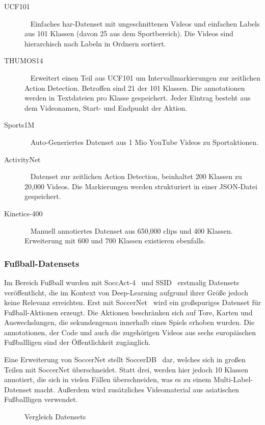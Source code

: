 \begin{description}
    \item[UCF101]~\cite{Soomro12} Einfaches \gls{har}-Datenset mit ungeschnittenen Videos und einfachen Labels aus 101 Klassen (davon 25 aus dem Sportbereich).
    Die Videos sind hierarchisch nach Labeln in Ordnern sortiert.
    \item[THUMOS14]~\cite{THUMOS14} Erweitert einen Teil aus UCF101 um Intervallmarkierungen zur zeitlichen Action Detection.
    Betroffen sind 21 der 101 Klassen.
    Die \gls{annotationen} werden in Textdateien pro Klasse gespeichert.
    Jeder Eintrag besteht aus dem Videonamen, Start- und Endpunkt der Aktion.
    \item[Sports1M]~\cite{Karpathy14} Auto-Generiertes Datenset aus 1 Mio YouTube Videos zu Sportaktionen.
    \item[ActivityNet]~\cite{Caba15} Datenset zur zeitlichen Action Detection, beinhaltet 200 Klassen zu 20,000 Videos.
    Die Markierungen werden strukturiert in einer JSON-Datei gespeichert.
    \item[Kinetics-400]~\cite{Kay17} Manuell annotiertes Datenset aus 650,000 \glspl{clip} und 400 Klassen.
    Erweiterung mit 600 und 700 Klassen existieren ebenfalls.
\end{description}

\subsubsection*{Fußball-Datensets}

Im Bereich Fußball wurden mit SoccAct-4~\cite{Ballan09} und SSID~\cite{Jiang16} erstmalig Datensets veröffentlicht, die im Kontext von Deep-Learning aufgrund ihrer Größe jedoch keine Relevanz erreichten.
Erst mit SoccerNet~\cite{Giancola18} wird ein großspuriges Datenset für Fußball-Aktionen erzeugt.
Die Aktionen beschränken sich auf Tore, Karten und Auswechslungen, die sekundengenau innerhalb eines Spiels erhoben wurden.
Die \gls{annotationen}, der Code und auch die zugehörigen Videos aus sechs europäischen Fußballligen sind der Öffentlichkeit zugänglich.

Eine Erweiterung von SoccerNet stellt SoccerDB~\cite{Jiang19} dar, welches sich in großen Teilen mit SoccerNet überschneidet.
Statt drei, werden hier jedoch 10 Klassen annotiert, die sich in vielen Fällen überschneiden, was es zu einem Multi-Label-Datenset macht.
Außerdem wird zusätzliches Videomaterial aus asiatischen Fußballligen verwendet.

\begin{figure}
    \centering
    \small{}
    \caption[Vergleich Datensets]{Vergleich Datensets}
    \label{tab:dataset}
\end{figure}

